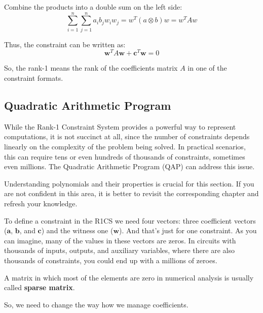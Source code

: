 \documentclass[../lecture-notes.tex]{subfiles}
\begin{document}
Combine the products into a double sum on the left side:
\[ \sum_{i=1}^{n} \sum_{j=1}^{n} a_i b_j w_i w_j = w^T (a \otimes b) w = w^T A w \]

Thus, the constraint can be written as:
\[ \mathbf{w}^T A \mathbf{w} + \mathbf{c}^T \mathbf{w} = 0 \]

So, the rank-1 means the rank of the coefficients matrix $A$ in one of the constraint formats.

\subsection{Quadratic Arithmetic Program}

While the Rank-1 Constraint System provides a powerful way to represent computations, it is not 
succinct at all, since the number of constraints depends linearly on the complexity of the problem 
being solved. In practical scenarios, this can require tens or even hundreds of thousands of 
constraints, sometimes even millions. The Quadratic Arithmetic Program (QAP) can address this issue.

\begin{remark}
    Understanding polynomials and their properties is crucial for this section. If you are not 
    confident in this area, it is better to revisit the corresponding chapter and refresh your
    knowledge.
\end{remark}

To define a constraint in the R1CS we need four vectors: three coefficient vectors ($\mathbf{a}$, $\mathbf{b}$, and
$\mathbf{c}$) and the witness one ($\mathbf{w}$). And that's just for one constraint. As you can imagine, many of
the values in these vectors are zeros. In circuits with thousands of inputs, outputs, and auxiliary
variables, where there are also thousands of constraints, you could end up with a millions of zeroes.
\begin{remark}
    A matrix in which most of the elements are zero in numerical analysis is usually called \textbf{sparse
    matrix}.
\end{remark}

So, we need to change the way how we manage coefficients. 
\end{document}
